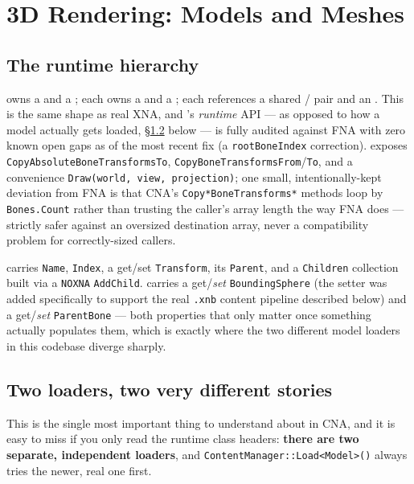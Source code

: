 \chapter{3D Rendering: Models and Meshes}
\label{ch:models-meshes}

\section{The runtime hierarchy}

 owns a  and a ;
each  owns a  and a
; each  references a shared
/ pair and an . This is the
same shape as real XNA, and 's \emph{runtime} API --- as opposed to how a
model actually gets loaded, \S\ref{sec:model-loading} below --- is fully audited against FNA
with zero known open gaps as of the most recent fix (a \texttt{rootBoneIndex} correction).
 exposes \texttt{CopyAbsoluteBoneTransformsTo},
\texttt{CopyBoneTransformsFrom}/\texttt{To}, and a convenience \texttt{Draw(world, view,
projection)}; one small, intentionally-kept deviation from FNA is that CNA's
\texttt{Copy*BoneTransforms*} methods loop by \texttt{Bones.Count} rather than trusting the
caller's array length the way FNA does --- strictly safer against an oversized destination
array, never a compatibility problem for correctly-sized callers.

 carries \texttt{Name}, \texttt{Index}, a get/set \texttt{Transform},
its \texttt{Parent}, and a \texttt{Children} collection built via a \texttt{NOXNA}
\texttt{AddChild}.  carries a get/\emph{set} \texttt{BoundingSphere}
(the setter was added specifically to support the real \texttt{.xnb} content pipeline
described below) and a get/\emph{set} \texttt{ParentBone} --- both properties that only
matter once something actually populates them, which is exactly where the two different
model loaders in this codebase diverge sharply.

\section{Two loaders, two very different stories}
\label{sec:model-loading}

This is the single most important thing to understand about  in CNA, and it
is easy to miss if you only read the runtime class headers: \textbf{there are two separate,
independent  loaders}, and \texttt{ContentManager::Load<Model>()} always
tries the newer, real one first.

